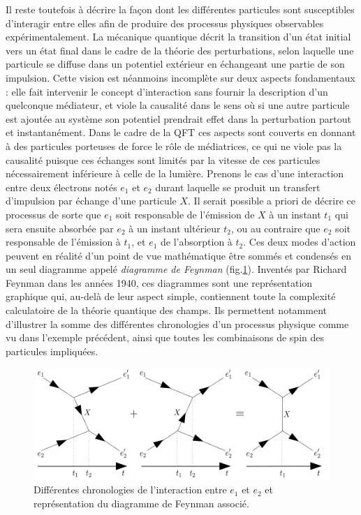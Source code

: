         Il reste toutefois à décrire la façon dont les différentes particules sont susceptibles d'interagir entre elles afin de produire des processus physiques observables expérimentalement. La mécanique quantique décrit la transition d'un état initial vers un état final dans le cadre de la théorie des perturbations, selon laquelle une particule se diffuse dans un potentiel extérieur en échangeant une partie de son impulsion. Cette vision est néanmoins incomplète sur deux aspects fondamentaux : elle fait intervenir le concept d'interaction sans fournir la description d'un quelconque médiateur, et viole la causalité dans le sens où si une autre particule est ajoutée au système son potentiel prendrait effet dans la perturbation partout et instantanément. Dans le cadre de la QFT ces aspects sont couverts en donnant à des particules porteuses de force le rôle de médiatrices, ce qui ne viole pas la causalité puisque ces échanges sont limités par la vitesse de ces particules nécessairement inférieure à celle de la lumière. Prenons le cas d'une interaction entre deux électrons notés $e_1$ et $e_2$ durant laquelle se produit un transfert d'impulsion par échange d'une particule $X$. Il serait possible a priori de décrire ce processus de sorte que $e_1$ soit responsable de l'émission de $X$ à un instant $t_1$ qui sera ensuite absorbée par $e_2$ à un instant ultérieur $t_2$, ou au contraire que $e_2$ soit responsable de l'émission à $t_1$, et $e_1$ de l'absorption à $t_2$. Ces deux modes d'action peuvent en réalité d'un point de vue mathématique être sommés et condensés en un seul diagramme appelé \textit{diagramme de Feynman} (fig.\ref{sumfeynman}). Inventés par Richard Feynman dans les années 1940, ces diagrammes sont une représentation graphique qui, au-delà de leur aspect simple, contiennent toute la complexité calculatoire de la théorie quantique des champs. Ils permettent notamment d'illustrer la somme des différentes  chronologies d'un processus physique comme vu dans l'exemple précédent, ainsi que toutes les combinaisons de spin des particules impliquées. \\
        
        \begin{figure}
            \centering
            \includegraphics[scale=0.28]{Chapitre1/Images/sumfeynman.png} 
            \caption{Différentes chronologies de l'interaction entre $e_1$ et $e_2$ et représentation du diagramme de Feynman associé.}
        \label{sumfeynman}
        \end{figure}
        
